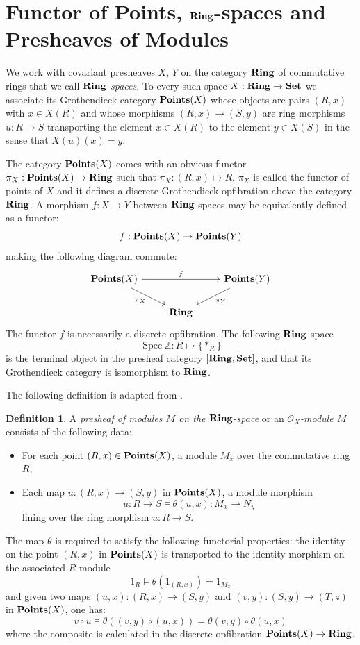 \documentclass[8pt]{article}
\theoremstyle{definition}
\newtheorem{definition}{Definition}[section]
\theoremstyle{definition}
\theoremstyle{definition}
\theoremstyle{definition}
\theoremstyle{definition}
\theoremstyle{definition}
\theoremstyle{definition}
\theoremstyle{definition}
\theoremstyle{definition}
\theoremstyle{definition}
\theoremstyle{definition}
\theoremstyle{definition}
\theoremstyle{definition}
\theoremstyle{definition}
\theoremstyle{question}
\begin{document}
\section{Functor of Points, ${\bf Ring}$-spaces and Presheaves of Modules}

We work with covariant presheaves $X$, $Y$ on the category ${\bf Ring}$ of commutative rings that we call \emph{${\bf Ring}$-spaces}.
To every such space $X : {\bf Ring} \to {\bf Set}$ we associate its Grothendieck category ${\bf Points}(X)$ whose objects 
are pairs $(R, x)$ with $x \in X(R)$ and whose morphisms $(R, x) \to (S, y)$ are ring morphisms $u : R \to S$ transporting 
the element $x \in X(R)$ to the element $y \in X(S)$ in the sense that $X(u)(x) = y$. 

The category ${\bf Points}(X)$ comes with an obvious functor $\pi_X : {\bf Points}(X) \to {\bf Ring}$ such that $\pi_X : (R, x) \mapsto R$. $\pi_X$ is called the functor of points of $X$ and 
it defines a discrete Grothendieck opfibration above the category ${\bf Ring}$. A morphism $f : X \to Y$ between ${\bf Ring}$-spaces may be equivalently 
defined as a functor:
\[
f : {\bf Points}(X) \to {\bf Points}(Y)
\]
making the following diagram commute:
\[
\begin{tikzcd}
  {\bf Points}(X) \ar[dr, "\pi_X"'] \ar[rr, "f"] && {\bf Points}(Y) \ar[dl, "\pi_Y"] \\
  & {\bf Ring}
\end{tikzcd}
\]
The functor $f$ is necessarily a discrete opfibration. The following ${\bf Ring}$-space
\[
\operatorname{Spec}\mathbb{Z} : R \mapsto \{ *_R \}
\]
is the terminal object in the presheaf category $[{\bf Ring}, {\bf Set}]$, and that its Grothendieck category is isomorphism to ${\bf Ring}$.

The following definition is adapted from \cite{rosenberg2011noncommutative}.

\begin{definition}
  A \emph{presheaf of modules $M$ on the ${\bf Ring}$-space} or an \emph{$\mathcal{O}_X$-module $M$} consists of the following data:
  \begin{itemize}
    \item For each point $(R, x) \in {\bf Points}(X)$, a module $M_x$ over the commutative ring $R$,
    \item Each map $u : (R, x) \to (S, y)$ in ${\bf Points}(X)$, a module morphism
    \[
    u : R \to S \models \theta(u,x) : M_x \to N_y
    \]
    lining over the ring morphism $u : R \to S$.
  \end{itemize}
\end{definition}
The map $\theta$ is required to satisfy the following functorial properties: the identity on the point $(R, x)$ in ${\bf Points}(X)$
is transported to the identity morphism on the associated $R$-module
\[
1_R \models \theta(1_{(R,x)}) = 1_{M_x}
\]
and given two maps $(u, x) : (R, x) \to (S, y)$ and $(v, y) : (S, y) \to (T, z)$ in ${\bf Points}(X)$, one has:
\[
v \circ u \models \theta((v, y) \circ (u, x)) = \theta(v, y) \circ \theta(u, x)
\]
where the composite is calculated in the discrete opfibration ${\bf Points}(X) \to {\bf Ring}$.
\end{document}
